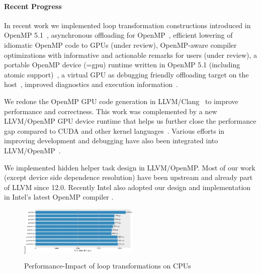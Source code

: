 \paragraph{Recent Progress}
In recent work we implemented loop transformation constructions introduced in OpenMP 5.1~\cite{kruse2021openmpbooth,kruse2021clangast}, asynchronous offloading for OpenMP~\cite{thiddenhelper}, efficient lowering of idiomatic OpenMP code to GPUs (under review),  OpenMP-aware compiler optimizations with informative and actionable remarks for users (under review), a portable OpenMP device (=gpu) runtime written in OpenMP 5.1 (including atomic support)~\cite{DBLP:conf/iwomp/TianCDC21}, a virtual GPU as debugging friendly
offloading target on the host~\cite{DBLP:conf/icppw/PatelTDC21}, improved diagnostics and execution information~\cite{DBLP:conf/icppw/DoerfertHC21,DBLP:conf/iwomp/HuberWGDH21}.

We redone the OpenMP GPU code generation in LLVM/Clang~\cite{OpenMPEncoding} to improve performance and correctness.
This work was complemented by a new LLVM/OpenMP GPU device runtime that helps us further close the performance gap compared to CUDA and other kernel languages~\cite{NewOpenMPRT}.
Various efforts in improving development and debugging have also been integrated into LLVM/OpenMP~\cite{DBLP:conf/icppw/DoerfertHC21,DBLP:conf/icppw/PatelTDC21}.

We implemented hidden helper task design in LLVM/OpenMP.
Most of our work \cite{DBLP:conf/iwomp/TianCDC21} (except device side dependence resolution) have been upstream and already part of LLVM since 12.0.
Recently Intel also adopted our design and implementation in Intel's latest OpenMP compiler \cite{TianUpdateOnIntelCompiler2021}.

\begin{figure}[tb]
\centering
{} ]{\includegraphics[width=0.5\textwidth]{projects/2.3.2-Tools/2.3.2.11-SOLLVE/unroll.pdf}}%
\caption{Performance-Impact of loop transformations on CPUs}
\label{fig:unrolltile}
\end{figure}

